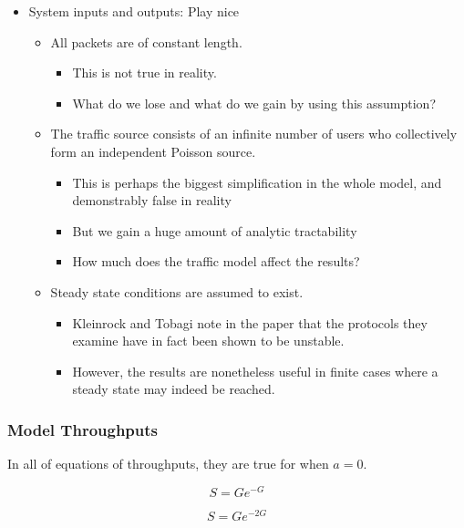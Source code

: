 \begin{itemize}[noitemsep]
\item System inputs and outputs: Play nice
  \begin{itemize}[noitemsep]
  \item All packets are of constant length.
    \begin{itemize}[noitemsep]
    \item This is not true in reality.
    \item What do we lose and what do we gain by using this assumption?
    \end{itemize}
  \item The traffic source consists of an infinite number of users who collectively form an independent Poisson source.
    \begin{itemize}[noitemsep]
    \item This is perhaps the biggest simplification in the whole model, and demonstrably false in reality
    \item But we gain a huge amount of analytic tractability
    \item How much does the traffic model affect the results?
    \end{itemize}

  \item Steady state conditions are assumed to exist.
    \begin{itemize}[noitemsep]
    \item Kleinrock and Tobagi note in the paper that the protocols they examine have in fact been shown to be unstable.
    \item However, the results are nonetheless useful in finite cases where a steady state may indeed be reached.
    \end{itemize}
  \end{itemize}
\end{itemize}

\subsubsection{Model Throughputs}\label{subsubsec:Kleinrock_Tobagi_Model_Throughputs}
In all of equations of throughputs, they are true for when $a = 0$.

\begin{equation}\label{eq:ALOHA_Throughput}
  S = Ge^{-G}
\end{equation}

\begin{equation}\label{eq:Slotted_ALOHA_Throughput}
  S = G e^{-2G}
\end{equation}

